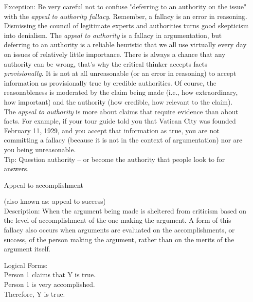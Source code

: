 \documentclass[a4paper,12pt,single,pdftex]{scrartcl}
\begin{document}
{    
      Exception: Be very careful not to confuse "deferring to an authority on the issue" with the {\it appeal to authority fallacy}. Remember, a fallacy is an error in reasoning. Dismissing the council of legitimate experts and authorities turns good skepticism into denialism. The {\it appeal to authority} is a fallacy in argumentation, but deferring to an authority is a reliable heuristic that we all use virtually every day on issues of relatively little importance. There is always a chance that any authority can be wrong, that’s why the critical thinker accepts facts {\it provisionally}. It is not at all unreasonable (or an error in reasoning) to accept information as provisionally true by credible authorities. Of course, the reasonableness is moderated by the claim being made (i.e., how extraordinary, how important) and the authority (how credible, how relevant to the claim).
    \\

    
      The {\it appeal to authority} is more about claims that require evidence than about facts. For example, if your tour guide told you that Vatican City was founded February 11, 1929, and you accept that information as true, you are not committing a fallacy (because it is not in the context of argumentation) nor are you being unreasonable.
    \\

    
      Tip: Question authority -- or become the authority that people look to for answers.
    \\

  }


Appeal to accomplishment
    
      (also known as: appeal to success)
    \\

  
    Description: When the argument being made is sheltered from criticism based on the level of accomplishment of the one making the argument.  A form of this fallacy also occurs when arguments are evaluated on the accomplishments, or success, of the person making the argument, rather than on the merits of the argument itself.

    
      Logical Forms:
    \\

    
      Person 1 claims that Y is true.
    \\

    
      Person 1 is very accomplished.
    \\

    
      Therefore, Y is true.
    \\
\end{document}
